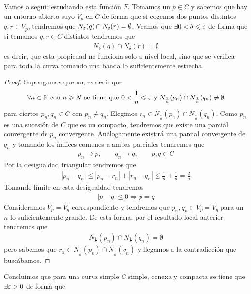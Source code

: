 Vamos a seguir estudiando esta función $F$. Tomamos un $p\in C$ y sabemos que hay un entorno abierto suyo $V_p$ en $C$ de forma que si cogemos dos puntos distintos $q,r\in V_p$, tendremos que $N_\varepsilon(q)\cap N_\varepsilon(r) = \emptyset$. Veamos que $\exists 0 < \delta \leqslant \varepsilon$ de forma que si tomamos $q,r\in C$ distintos tendremos que 
\begin{gather*}
    N_\delta(q) \cap N_\delta(r) = \emptyset
\end{gather*}
es decir, que esta propiedad no funciona solo a nivel local, sino que se verifica para toda la curva tomando una banda lo suficientemente estrecha.
\begin{proof}
    Supongamos que no, es decir que
    \begin{gather*}
        \forall n\in \mathbb{N} \text{ con } n\geqslant N \text{ se tiene que } 0<\frac{1}{n}\leqslant \varepsilon \text{ y } N_{\frac{1}{n}}(p_n)\cap N_{\frac{1}{n}}(q_n) \neq \emptyset
    \end{gather*}
    para ciertos $p_n,q_n\in C$ con $p_n\neq q_n$. Elegimos $r_n\in  N_{\frac{1}{n}}(p_n)\cap N_{\frac{1}{n}}(q_n)$. Como $p_n$ es una sucesión de $C$ que es un compacto, tendremos que existe una parcial convergente de $p_n$ convergente. Análogamente existirá una parcial convergente de $q_n$ y tomando los índices comunes a ambas parciales tendremos que 
    \begin{gather*}
        p_n \longrightarrow p , \qquad q_n \longrightarrow q,\qquad p,q\in C
    \end{gather*}
    Por la desigualdad triangular tendremos que 
    \begin{gather*}
        |p_n - q_n| \leq |p_n - r_n| + |r_n-q_n| \leq \frac{1}{n} + \frac{1}{n} = \frac{2}{n}
    \end{gather*}
    Tomando límite en esta desigualdad tendremos 
    \begin{gather*}
        |p-q| \leq 0 \Rightarrow p=q
    \end{gather*}
    Consideramos $V_p=V_q$ correspondiente y tendremos que $p_n,q_n\in V_p=V_q$ para un $n$ lo suficientemente grande. De esta forma, por el resultado local anterior tendremos que 
    \begin{gather*}
        N_{\frac{1}{n}}(p_n)\cap N_{\frac{1}{n}}(q_n) = \emptyset
    \end{gather*} 
    pero sabemos que $r_n\in N_{\frac{1}{n}}(p_n)\cap N_{\frac{1}{n}}(q_n)$ y llegamos a la contradicción que buscábamos.
\end{proof}
Concluimos que para una curva simple $C$ simple, conexa y compacta se tiene que $\exists \varepsilon>0$ de forma que 
